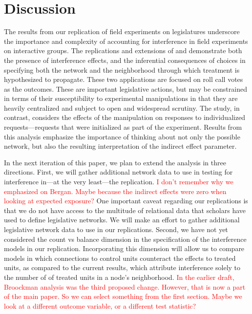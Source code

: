 \documentclass[12pt]{article}
\begin{document}
\section{Discussion}
The results from our replication of field experiments on legislatures underscore the importance and complexity of accounting for interference in field experiments on interactive groups. The replications and extensions of \citet{coppock2014information} and \citet{bergan2015call} demonstrate both the presence of interference effects, and the inferential consequences of choices in specifying both the network and the neighborhood through which treatment is hypothesized to propagate. These two applications are focused on roll call votes as the outcomes. These are important legislative actions, but may be constrained in terms of their susceptibility to experimental manipulations in that they are heavily centralized and subject to open and widespread scrutiny. The \citet{broockman2013black} study, in contrast, considers the effects of the manipulation on responses to individualized requests---requests that were initialized as part of the experiment. Results from this analysis emphasize the importance of thinking about not only the possible network, but also the resulting interpretation of the indirect effect parameter. %


In the next iteration of this paper, we plan to extend the analysis in three directions. First, we will gather additional network data to use in testing for interference in---at the very least---the \citet{bergan2015call} replication. \textcolor{red}{I don't remember why we emphasized on Bergan. Maybe because the indirect effects were zero when looking at expected exposure?} One important caveat regarding our replications is that we do not have access to the multitude of relational data that scholars have used to define legislative networks. We will make an effort to gather additional legislative network data to use in our replications. Second, we have not yet considered the count vs balance dimension in the specification of the interference models in our replication. Incorporating this dimension will allow us to compare models in which connections to control units counteract the effects to treated units, as compared to the current results, which attribute interference solely to the number of of treated units in a node's neighborhood. \textcolor{red}{In the earlier draft, Broockman analysis was the third proposed change. However, that is now a part of the main paper. So we can select something from the first section. Maybe we look at a different outcome variable, or a different test statistic?}
\end{document}
